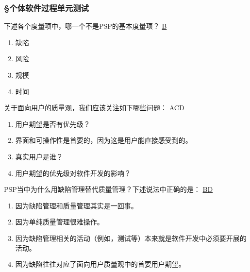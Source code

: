 \subsubsection*{\S 个体软件过程单元测试}
\setcounter{problemname}{0}

\begin{problem}
    下述各个度量项中，哪一个不是PSP的基本度量项？
    \uline{B}    
    \vspace{-0.8em}
    \begin{multicols}{4}
        \begin{enumerate}[label=\Alph*.]
            \item 缺陷
            \item 风险
            \item 规模
            \item 时间
        \end{enumerate}
    \end{multicols}
    \vspace{-1em}
\end{problem}



\begin{problem}
    关于面向用户的质量观，我们应该关注如下哪些问题：
    \uline{ACD}    
        \begin{enumerate}[label=\Alph*.]
            \item 用户期望是否有优先级？
            \item 界面和可操作性是首要的，因为这是用户能直接感受到的。
            \item 真实用户是谁？
            \item 用户期望的优先级对软件开发的影响？
        \end{enumerate}
\end{problem}



\begin{problem}
	PSP当中为什么用缺陷管理替代质量管理？下述说法中正确的是：
	\uline{BD}    
        \begin{enumerate}[label=\Alph*.]
            \item 因为缺陷管理和质量管理其实是一回事。
            \item 因为单纯质量管理很难操作。
            \item 因为缺陷管理相关的活动（例如，测试等）本来就是软件开发中必须要开展的活动。
            \item 因为缺陷往往对应了面向用户质量观中的首要用户期望。
        \end{enumerate}
\end{problem}




